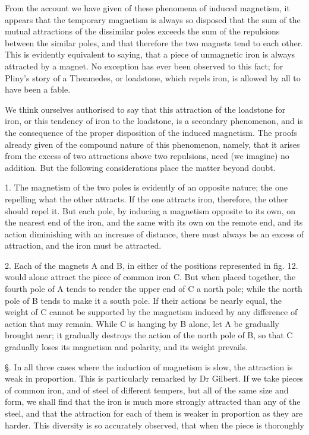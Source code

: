 \documentclass{article}
\begin{document}
From the account we have given of these phenomena of induced magnetism, it appears that the temporary magnetism is always so disposed that the sum of the mutual attractions of the dissimilar poles exceeds the sum of the repulsions between the similar poles, and that therefore the two magnets tend to each other. This is evidently equivalent to saying, that a piece of unmagnetic iron is always attracted by a magnet. No exception has ever been observed to this fact; for Pliny's story of a Theamedes, or loadstone, which repels iron, is allowed by all to have been a fable.

We think ourselves authorised to say that this attraction of the loadstone for iron, or this tendency of iron to the loadstone, is a secondary phenomenon, and is the consequence of the proper disposition of the induced magnetism. The proofs already given of the compound nature of this phenomenon, namely, that it arises from the excess of two attractions above two repulsions, need (we imagine) no addition. But the following considerations place the matter beyond doubt.

1. The magnetism of the two poles is evidently of an opposite nature; the one repelling what the other attracts. If the one attracts iron, therefore, the other should repel it. But each pole, by inducing a magnetism opposite to its own, on the nearest end of the iron, and the same with its own on the remote end, and its action diminishing with an increase of distance, there must always be an excess of attraction, and the iron must be attracted.

2. Each of the magnets A and B, in either of the positions represented in fig. 12. would alone attract the piece of common iron C. But when placed together, the fourth pole of A tends to render the upper end of C a north pole; while the north pole of B tends to make it a south pole. If their actions be nearly equal, the weight of C cannot be supported by the magnetism induced by any difference of action that may remain. While C is hanging by B alone, let A be gradually brought near; it gradually destroys the action of the north pole of B, so that C gradually loses its magnetism and polarity, and its weight prevails.

§. In all three cases where the induction of magnetism is slow, the attraction is weak in proportion. This is particularly remarked by Dr Gilbert. If we take pieces of common iron, and of steel of different tempers, but all of the same size and form, we shall find that the iron is much more strongly attracted than any of the steel, and that the attraction for each of them is weaker in proportion as they are harder. This diversity is so accurately observed, that when the piece is thoroughly
\end{document}
